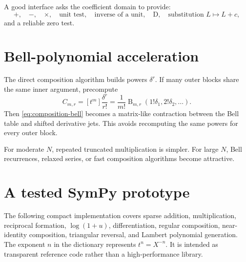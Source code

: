 \documentclass[11pt,openany]{book}
\theoremstyle{definition}
\theoremstyle{plain}
\theoremstyle{remark}
\newcommand{\Bell}{\operatorname{B}}
\newcommand{\Dop}{\mathrm{D}}
\begin{document}
A good interface asks the coefficient domain to provide:
\[
 +,\quad -,\quad \times,\quad \text{unit test},\quad \text{inverse of a unit},
 \quad \Dop,\quad \text{substitution }L\mapsto L+c,
\]
and a reliable zero test.

\section{Bell-polynomial acceleration}
The direct composition algorithm builds powers \(\delta^r\).  If many outer
blocks share the same inner argument, precompute
\[
 C_{m,r}=[t^m]\frac{\delta^r}{r!}
 =\frac1{m!}\Bell_{m,r}
 (1!\delta_1,2!\delta_2,\ldots).
\]
Then \cref{eq:composition-bell} becomes a matrix-like contraction between the
Bell table and shifted derivative jets.  This avoids recomputing the same
powers for every outer block.

For moderate \(N\), repeated truncated multiplication is simpler.  For large
\(N\), Bell recurrences, relaxed series, or fast composition algorithms become
attractive.

\section{A tested SymPy prototype}
The following compact implementation covers sparse addition, multiplication,
reciprocal formation, \(\log(1+u)\), differentiation, regular composition,
near-identity composition, triangular reversal, and Lambert polynomial
generation.  The exponent \(n\) in the dictionary represents
\(t^n=X^{-n}\).  It is intended as transparent reference code rather than a
high-performance library.
\end{document}
